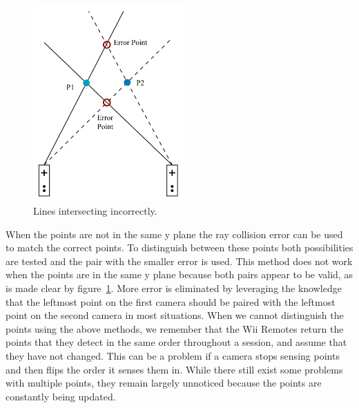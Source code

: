 \documentclass[a4paper,twoside]{article}
\begin{document}
\begin{figure}[ht] \begin{center}
\includegraphics[height = 7.5cm]{Diagram5_IntersectingRays} \end{center}
\caption{Lines intersecting incorrectly.} \label{intersection} \end{figure}

When the points are not in the same y plane the ray collision  error can be
used to match the correct points. To distinguish between these points both
possibilities are tested and the pair with the smaller error is used. This
method does not work when the points are in the same y plane because both pairs
appear to be valid, as is made clear by figure~\ref{intersection}. More error
is eliminated by leveraging the knowledge that the leftmost point on the first
camera should be paired with the leftmost point on the second camera in most
situations. When we cannot distinguish the points using the above methods, we
remember that the Wii Remotes return the points that they detect in the same
order throughout a session, and assume that they have not changed. This can be
a problem if a camera stops sensing points and then flips the order it senses
them in. While there still exist some problems with multiple points, they
remain largely unnoticed because the points are constantly being updated.
\end{document}
